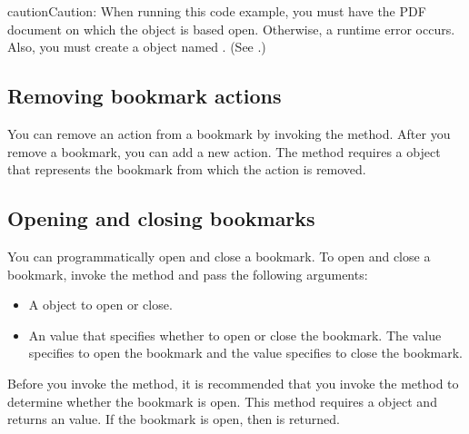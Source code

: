 \documentclass[letterpaper,12pt,english,openany,oneside]{sphinxmanual}
\begin{document}
\begin{sphinxadmonition}{caution}{Caution:}
When running this code example, you must have the PDF document on which the  object is based open. Otherwise, a run\sphinxhyphen{}time error occurs. Also, you must create a  object named . (See .)
\end{sphinxadmonition}


\subsection{Removing bookmark actions}
\label{\detokenize{Plugins_Bookmark:removing-bookmark-actions}}
You can remove an action from a bookmark by invoking the  method. After you remove a bookmark, you can add a new action. The  method requires a  object that represents the bookmark from which the action is removed.


\subsection{Opening and closing bookmarks}
\label{\detokenize{Plugins_Bookmark:opening-and-closing-bookmarks}}
You can programmatically open and close a bookmark. To open and close a bookmark, invoke the  method and pass the following arguments:
\begin{itemize}
\item {} 
A  object to open or close.

\item {} 
An  value that specifies whether to open or close the bookmark. The value  specifies to open the bookmark and the value  specifies to close the bookmark.

\end{itemize}

Before you invoke the  method, it is recommended that you invoke the  method to determine whether the bookmark is open. This method requires a  object and returns an  value. If the bookmark is open, then  is returned.
\end{document}

